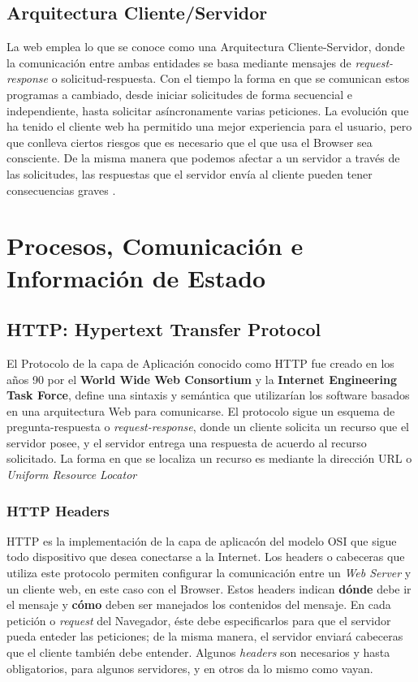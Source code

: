     \subsection{Arquitectura Cliente/Servidor}
    \label{chap2:ArqCS}
    La web emplea lo que se conoce como una Arquitectura Cliente-Servidor, donde la comunicación entre ambas entidades se basa mediante mensajes de \textit{request-response} o solicitud-respuesta. Con el tiempo la forma en que se comunican estos programas a cambiado, desde iniciar solicitudes de forma secuencial e independiente, hasta solicitar asíncronamente varias peticiones. La evolución que ha tenido el cliente web ha permitido una mejor experiencia para el usuario, pero que conlleva ciertos riesgos que es necesario que el que usa el Browser sea consciente. De la misma manera que podemos afectar a un servidor a través de las solicitudes, las respuestas que el servidor envía al cliente pueden tener consecuencias graves \cite{alcorn2014browser}.


\section{Procesos, Comunicación e Información de Estado}

    \subsection{HTTP: Hypertext Transfer Protocol}
    \label{chap2:HTTP}
    El Protocolo de la capa de Aplicación conocido como HTTP fue creado en los años 90 por el \textbf{World Wide Web Consortium} y la \textbf{Internet Engineering Task Force}, define una sintaxis y semántica que utilizarían los software basados en una arquitectura Web para comunicarse. El protocolo sigue un esquema de pregunta-respuesta o \textit{request-response}, donde un cliente solicita un recurso que el servidor posee, y el servidor entrega una respuesta de acuerdo al recurso solicitado. La forma en que se localiza un recurso es mediante la dirección URL o \textit{Uniform Resource Locator}

        \subsubsection{HTTP Headers}
        \label{chap2:headers}
        HTTP es la implementación de la capa de aplicacón del modelo OSI que sigue todo dispositivo que desea conectarse a la Internet. Los headers o cabeceras que utiliza este protocolo permiten configurar la comunicación entre un \textit{Web Server} y un cliente web, en este caso con el Browser. Estos headers indican \textbf{dónde} debe ir el mensaje y \textbf{cómo} deben ser manejados los contenidos del mensaje. En cada petición o \textit{request} del Navegador, éste debe especificarlos para que el servidor pueda enteder las peticiones; de la misma manera, el servidor enviará cabeceras que el cliente también debe entender. Algunos \textit{headers} son necesarios y hasta obligatorios, para algunos servidores, y en otros da lo mismo como vayan.

